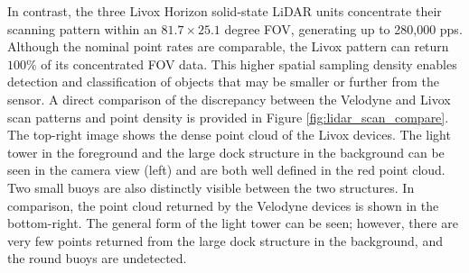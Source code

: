 \documentclass{erauthesis}
\begin{document}

In contrast, the three Livox Horizon solid-state \ac{LiDAR} units concentrate their scanning pattern within an $81.7 \times 25.1$ degree \ac{FOV}, generating up to 280,000 \ac{pps}. 
Although the nominal point rates are comparable, the Livox pattern can return $100 \%$ of its concentrated \ac{FOV} data. 
This higher spatial sampling density enables detection and classification of objects that may be smaller or further from the sensor.
A direct comparison of the discrepancy between the Velodyne and Livox scan patterns and point density is provided in Figure \ref{fig:lidar_scan_compare}.
The top-right image shows the dense point cloud of the Livox devices.
The light tower in the foreground and the large dock structure in the background can be seen in the camera view (left) and are both well defined in the red point cloud.
Two small buoys are also distinctly visible between the two structures.
In comparison, the point cloud returned by the Velodyne devices is shown in the bottom-right. 
The general form of the light tower can be seen; however, there are very few points returned from the large dock structure in the background, and the round buoys are undetected.
\end{document}
